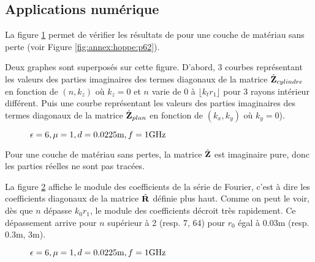   \subsection{Applications numérique}

    La figure \ref{fig:imp_fourier:cylindre:hoppe_p62:converge_rayon} permet de vérifier les résultats de \cite[p.~62]{hoppe_impedance_1995} pour une couche de matériau sans perte (voir Figure \ref{fig:annex:hoppe:p62}). 

    Deux graphes sont superposés sur cette figure. D'abord, 3 courbes représentant les valeurs des parties imaginaires des termes diagonaux de la matrice \(\hat{\mathbf{Z}}_{cylindre}\) en fonction de \((n,k_z)\) où \(k_z=0\) et \(n\) varie de \(0\) à \(\lfloor k_t r_1 \rfloor\) pour 3 rayons intérieur différent. Puis une courbe représentant les valeurs des parties imaginaires des termes diagonaux de la matrice \(\hat{\mathbf{Z}}_{plan}\) en fonction de \((k_x,k_y)\) où \(k_y=0\)).
    \begin{figure}[!hbt]
      \centering
      
      \caption{\(\epsilon = 6, \mu = 1, d=0.0225\text{m}, f=1\text{GHz}\)}
      \label{fig:imp_fourier:cylindre:hoppe_p62:converge_rayon}
    \end{figure}
    Pour une couche de matériau sans pertes, la matrice \(\hat{\mathbf{Z}}\) est imaginaire pure, donc les parties réelles ne sont pas tracées.


    La figure \ref{fig:imp_fourier:cylindre:hoppe_p62:coeff_fourier} affiche le module des coefficients de la série de Fourier, c'est à dire les coefficients diagonaux de la matrice \(\hat{\mathbf{R}}\) définie plus haut. Comme on peut le voir, dès que \(n\) dépasse \(k_0r_{1}\), le module des coefficients décroit très rapidement. Ce dépassement arrive pour \(n\) supérieur à 2 (resp. 7, 64) pour \(r_0\) égal à 0.03m (resp. 0.3m, 3m).

    \begin{figure}[!hbt]
      \centering
      
      \caption{\(\epsilon = 6, \mu = 1, d=0.0225\text{m}, f=1\text{GHz}\)}
      \label{fig:imp_fourier:cylindre:hoppe_p62:coeff_fourier}
    \end{figure}